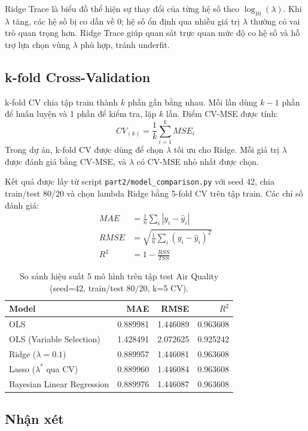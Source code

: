 \documentclass[a4paper]{article}
\begin{document}
Ridge Trace là biểu đồ thể hiện sự thay đổi của từng hệ số theo $\log_{10}(\lambda)$. Khi $\lambda$ tăng, các hệ số bị co dần về 0; hệ số ổn định qua nhiều giá trị $\lambda$ thường có vai trò quan trọng hơn. Ridge Trace giúp quan sát trực quan mức độ co hệ số và hỗ trợ lựa chọn vùng $\lambda$ phù hợp, tránh underfit.

\subsection{k-fold Cross-Validation}
k-fold CV chia tập train thành $k$ phần gần bằng nhau. Mỗi lần dùng $k-1$ phần để huấn luyện và 1 phần để kiểm tra, lặp $k$ lần. Điểm CV-MSE được tính:
\begin{equation}
CV_{(k)} = \frac{1}{k}\sum_{i=1}^{k} MSE_i
\end{equation}
Trong dự án, k-fold CV được dùng để chọn $\lambda$ tối ưu cho Ridge. Mỗi giá trị $\lambda$ được đánh giá bằng CV-MSE, và $\lambda$ có CV-MSE nhỏ nhất được chọn.

Kết quả được lấy từ script \texttt{part2/model\_comparison.py} với seed 42, chia train/test 80/20 và chọn lambda Ridge bằng 5-fold CV trên tập train. Các chỉ số đánh giá:
\begin{align*}
MAE &= \frac{1}{n}\sum_i |y_i-\hat{y}_i| \\
RMSE &= \sqrt{\frac{1}{n}\sum_i (y_i-\hat{y}_i)^2} \\
R^2 &= 1 - \frac{RSS}{TSS}
\end{align*}

\begin{table}[H]
\centering
\begin{tabular}{lrrr}
\hline
Model & MAE & RMSE & $R^2$ \\
\hline
OLS & 0.889981 & 1.446089 & 0.963608 \\
OLS (Variable Selection) & 1.428491 & 2.072625 & 0.925242 \\
Ridge ($\lambda=0.1$) & 0.889957 & 1.446081 & 0.963608 \\
Lasso ($\lambda^*$ qua CV) & 0.889960 & 1.446084 & 0.963608 \\
Bayesian Linear Regression & 0.889976 & 1.446087 & 0.963608 \\
\hline
\end{tabular}
\caption{So sánh hiệu suất 5 mô hình trên tập test Air Quality (seed=42, train/test 80/20, k=5 CV).}
\end{table}

\subsection{Nhận xét}
\end{document}
